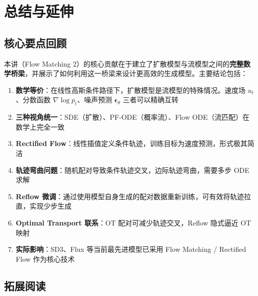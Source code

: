 \section{总结与延伸}

\subsection{核心要点回顾}

本讲（Flow Matching 2）的核心贡献在于建立了扩散模型与流模型之间的\textbf{完整数学桥梁}，并展示了如何利用这一桥梁来设计更高效的生成模型。主要结论包括：

\begin{enumerate}
    \item \textbf{数学等价}：在线性高斯条件路径下，扩散模型是流模型的特殊情况。速度场 $u_t$、分数函数 $\nabla \log p_t$、噪声预测 $\boldsymbol{\epsilon}_\theta$ 三者可以精确互转

    \item \textbf{三种视角统一}：SDE（扩散）、PF-ODE（概率流）、Flow ODE（流匹配）在数学上完全一致

    \item \textbf{Rectified Flow}：线性插值定义条件轨迹，训练目标为速度预测，形式极其简洁

    \item \textbf{轨迹弯曲问题}：随机配对导致条件轨迹交叉，边际轨迹弯曲，需要多步 ODE 求解

    \item \textbf{Reflow 微调}：通过使用模型自身生成的配对数据重新训练，可有效将轨迹拉直，实现少步生成

    \item \textbf{Optimal Transport 联系}：OT 配对可减少轨迹交叉，Reflow 隐式逼近 OT 映射

    \item \textbf{实际影响}：SD3、Flux 等当前最先进模型已采用 Flow Matching / Rectified Flow 作为核心技术
\end{enumerate}

\subsection{拓展阅读}

